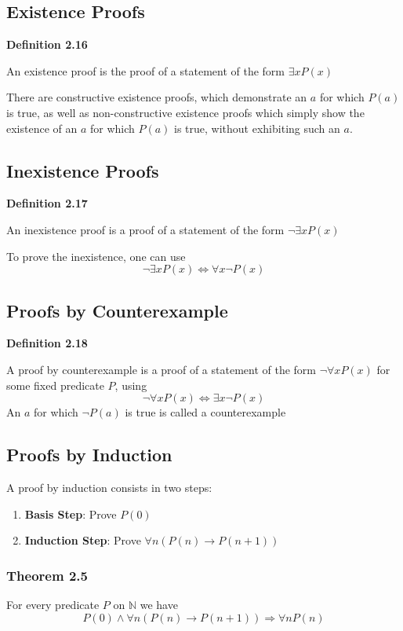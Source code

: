 \documentclass[a4paper]{report}
\newenvironment{definition}[1]{\begin{framed}\centerline{\textbf{Definition #1}}\noindent\hspace{-1.1mm}}{\end{framed}}
\newcommand{\N}{\mathbb{N}}
\begin{document}
\subsection{Existence Proofs}
\begin{definition}{2.16}
An existence proof is the proof of a statement of the form $\exists x P(x)$
\end{definition}
There are constructive existence proofs, which demonstrate an $a$ for which $P(a)$ is true, as well as non-constructive existence proofs which simply show the existence of an $a$ for which $P(a)$ is true, without exhibiting such an $a$.

\subsection{Inexistence Proofs}
\begin{definition}{2.17}
An inexistence proof is a proof of a statement of the form $\lnot \exists x P(x)$
\end{definition}
To prove the inexistence, one can use \[\lnot\exists x P(x)\Longleftrightarrow \forall x\lnot P(x)\]

\subsection{Proofs by Counterexample}
\begin{definition}{2.18}
A proof by counterexample is a proof of a statement of the form $\lnot\forall x P(x)$ for some fixed predicate $P$, using \[\lnot \forall x P(x)\Longleftrightarrow \exists x\lnot P(x)\]
An $a$ for which $\lnot P(a)$ is true is called a counterexample
\end{definition}

\subsection{Proofs by Induction}
A proof by induction consists in two steps:
\begin{enumerate}
\item \textbf{Basis Step}: Prove $P(0)$
\item \textbf{Induction Step}: Prove $\forall n(P(n)\to P(n+1))$
\end{enumerate}
\subsubsection*{Theorem 2.5}
For every predicate $P$ on $\N$ we have \[P(0)\land\forall n(P(n)\to P(n+1))\Longrightarrow \forall n P(n)\]
\end{document}
